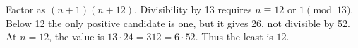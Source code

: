 Factor as $(n+1)(n+12)$. Divisibility by 13 requires $n\equiv12$ or $1\pmod{13}$. Below 12 the only positive candidate is one, but it gives 26, not divisible by 52. At $n=12$, the value is $13\cdot24=312=6\cdot52$. Thus the least is $\boxed{12}$.
